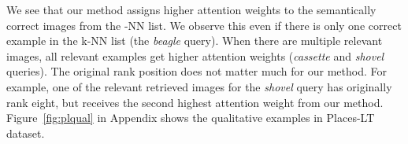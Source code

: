 We see that our method assigns higher attention weights to the semantically correct images from the -NN list.
We observe this even if there is only one correct example in the k-NN list (\eg the \emph{beagle} query).
When there are multiple relevant images, all relevant examples get higher attention weights (\eg \emph{cassette} and \emph{shovel} queries).
The original rank position does not matter much for our method.
For example, one of the relevant retrieved images for the \emph{shovel} query has originally rank eight, but receives the second highest attention weight from our method.
Figure~\ref{fig:plqual} in Appendix shows the qualitative examples in Places-LT dataset.
